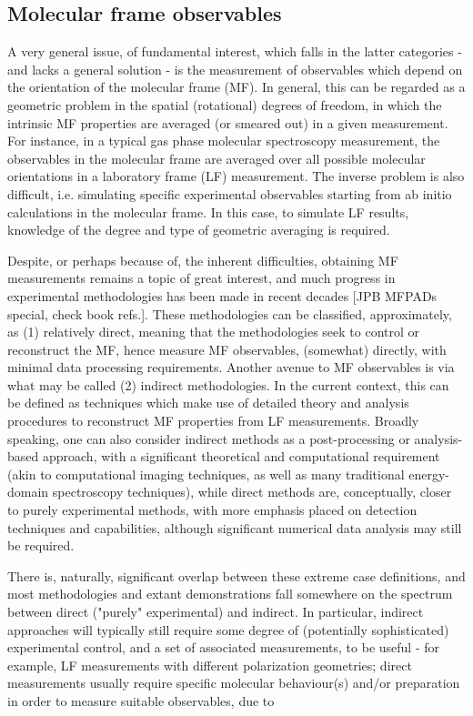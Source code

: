 \subsection{Molecular frame observables}

A very general issue, of fundamental interest, which falls in the latter categories - and lacks a general solution - is the measurement of observables which depend on the orientation of the molecular frame (MF). In general, this can be regarded as a geometric problem in the spatial (rotational) degrees of freedom, in which the intrinsic MF properties are averaged (or smeared out) in a given measurement. For instance, in a typical gas phase molecular spectroscopy measurement, the observables in the molecular frame  are averaged over all possible molecular orientations in a laboratory frame (LF) measurement. The inverse problem is also difficult, i.e. simulating specific experimental observables starting from ab initio calculations in the molecular frame. In this case, to simulate LF results, knowledge of the degree and type of geometric averaging is required. 

Despite, or perhaps because of, the inherent difficulties, obtaining  MF measurements remains a topic of great interest, and much progress in experimental methodologies has been made in recent decades \cite{Becker1998,Reid2003,Reid2012, kleinpoppen2013perfect, Yagishita2015, hockett2018QuantumMetrologyPhotoelectrons} [JPB MFPADs special, check book refs.]. These methodologies can be classified, approximately, as (1) relatively direct, meaning that the methodologies seek to control or reconstruct the MF, hence measure MF observables, (somewhat) directly, with minimal data processing requirements. Another avenue to MF observables is via what may be called (2) indirect methodologies. In the current context, this can be defined as techniques which make use of detailed theory and analysis procedures to reconstruct MF properties from LF measurements. Broadly speaking, one can also consider indirect methods as a post-processing or analysis-based approach, with a significant theoretical and computational requirement (akin to computational imaging techniques, as well as many traditional energy-domain spectroscopy techniques), while direct methods are, conceptually, closer to purely experimental methods, with more emphasis placed on detection techniques and capabilities, although significant numerical data analysis may still be required. 

There is, naturally, significant overlap between these extreme case definitions, and most methodologies and extant demonstrations fall somewhere on the spectrum between direct ("purely" experimental) and indirect. In particular, indirect approaches will typically still require some degree of (potentially sophisticated) experimental control, and a set of associated measurements, to be useful - for example, LF measurements with different polarization geometries; direct measurements usually require specific molecular behaviour(s) and/or preparation in order to measure suitable observables, due to 